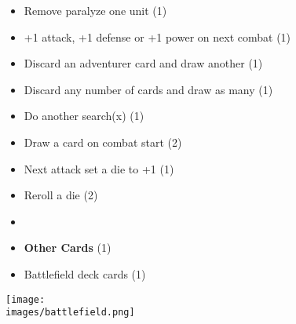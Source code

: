 \begin{multicols}{3}
\begin{itemize}[leftmargin=0pt, label={}, noitemsep]
  \item Remove paralyze one unit (1)
  \item +1 attack, +1 defense or +1 power on next combat (1)
  \item Discard an adventurer card and draw another (1)
  \item Discard any number of cards and draw as many (1)
  \item Do another search(x) (1)
  \item Draw a card on combat start (2)
  \item Next attack set a die to +1 (1)
  \item Reroll a die (2)
  \item
  \item \textbf{Other Cards} (1)
  \item Battlefield deck cards (1)
\end{itemize}

\end{multicols}

\vfill
\begin{center}
  \texttt{[image: \\images/battlefield.png]}
\end{center}
